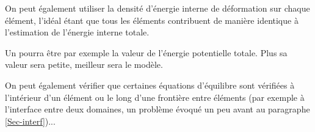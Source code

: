 On peut également utiliser la densité d'énergie interne de
déformation sur chaque élément, l'idéal étant que tous les
éléments contribuent de manière identique à l'estimation de
l'énergie interne totale.

\medskip
Un  pourra être par exemple
la valeur de l'énergie potentielle totale. Plus sa valeur sera petite, meilleur
sera le modèle.

\medskip
On peut également vérifier que certaines équations d'équilibre sont vérifiées
à l'intérieur d'un élément ou le long d'une frontière entre éléments (par
exemple à l'interface entre deux domaines, un problème évoqué un peu avant
au paragraphe \ref{Sec-interf})...


\ifVersionAvecExemplesSepares\else
\fi
